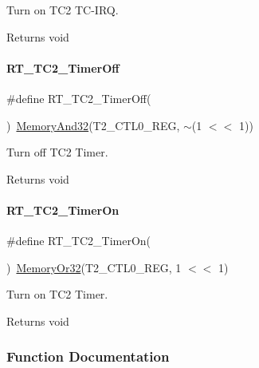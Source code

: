 Turn on T\+C2 T\+C-\/\+I\+RQ. 

\begin{DoxyReturn}{Returns}
void 
\end{DoxyReturn}
\mbox{\label{a00047_a4328299fe0323ef75508eadf9b937ba1}} 
\paragraph{\texorpdfstring{R\+T\+\_\+\+T\+C2\+\_\+\+Timer\+Off}{RT\_TC2\_TimerOff}}
{\footnotesize\ttfamily \#define R\+T\+\_\+\+T\+C2\+\_\+\+Timer\+Off(\begin{DoxyParamCaption}{ }\end{DoxyParamCaption})~\mbox{\hyperlink{a00020_a5c1a2bd4c1bd4c2f429d8042a45327ff}{Memory\+And32}}(T2\+\_\+\+C\+T\+L0\+\_\+\+R\+EG, $\sim$(1 $<$$<$ 1))}



Turn off T\+C2 Timer. 

\begin{DoxyReturn}{Returns}
void 
\end{DoxyReturn}
\mbox{\label{a00047_ab274ee44af2080d68745b2ec3af06648}} 
\paragraph{\texorpdfstring{R\+T\+\_\+\+T\+C2\+\_\+\+Timer\+On}{RT\_TC2\_TimerOn}}
{\footnotesize\ttfamily \#define R\+T\+\_\+\+T\+C2\+\_\+\+Timer\+On(\begin{DoxyParamCaption}{ }\end{DoxyParamCaption})~\mbox{\hyperlink{a00020_a9ea92ebccdef6bdaca4d00210cc7266d}{Memory\+Or32}}(T2\+\_\+\+C\+T\+L0\+\_\+\+R\+EG, 1 $<$$<$ 1)}



Turn on T\+C2 Timer. 

\begin{DoxyReturn}{Returns}
void 
\end{DoxyReturn}


\subsubsection{Function Documentation}
\mbox{\label{a00047_a295c11e348fa97400f36ddf1ece55368}} 
